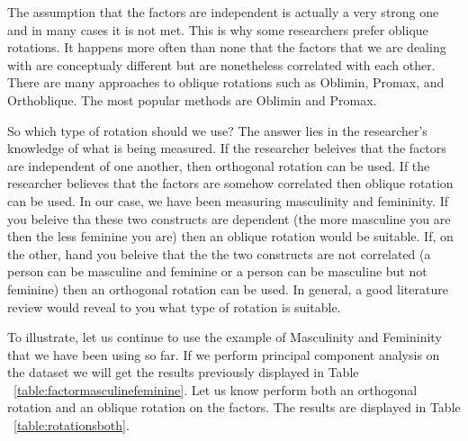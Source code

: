 \documentclass[a4paper,12pt,oneside]{book}
\begin{document}
The assumption that the factors are independent is actually a very strong one and in many cases it is not met. This is why some researchers
prefer oblique rotations. It happens more often than none that the factors that we are dealing with are conceptualy different but are nonetheless
correlated with each other. There are many approaches to oblique rotations such as Oblimin, Promax, and Orthoblique. The most popular methods
are Oblimin and Promax. 

So which type of rotation should we use? The answer lies in the researcher's knowledge of what is being measured. If the researcher beleives that
the factors are independent of one another, then orthogonal rotation can be used. If the researcher believes that the factors are somehow correlated
then oblique rotation can be used. In our case, we have been measuring masculinity and femininity. If you beleive tha these two constructs are
dependent (the more masculine you are then the less feminine you are) then an oblique rotation would be suitable. If, on the other, hand you 
beleive that the the two constructs are not correlated (a person can be masculine and feminine or a person can be masculine but not feminine) then
an orthogonal rotation can be used. In general, a good literature review would reveal to you what type of rotation is suitable.

To illustrate, let us continue to use the example of Masculinity and Femininity that we have been using so far. If we perform principal component
analysis on the dataset we will get the results previously displayed in Table ~\ref{table:factormasculinefeminine}. Let us know perform both an
orthogonal rotation and an oblique rotation on the factors. The results are displayed in Table ~\ref{table:rotationsboth}.
\end{document}
